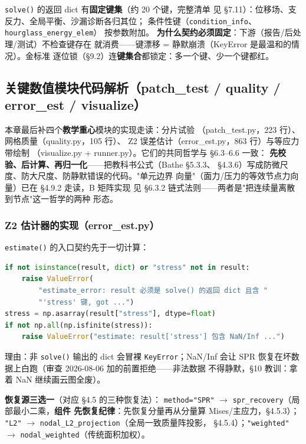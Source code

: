\documentclass[12pt,a4paper]{ctexart}
\newcommand{\fem}{\Verb}
\begin{document}
\fem|solve()| 的返回 dict 有\textbf{固定键集}（约 20 个键，完整清单
见 §7.11）：位移场、支反力、全局平衡、沙漏诊断各归其位；
条件性键（\fem|condition_info|、\fem|hourglass_energy_elem|）
按参数附加。
\textbf{为什么契约必须固定}：下游（报告/后处理/测试）不检查键存在
就消费——键漂移 = 静默崩溃（KeyError 是最温和的情况）。金标准
逐位锁（§9.2）连\textbf{键集合}都锁定：多一个键、少一个键都红。

\subsection{关键数值模块代码解析（patch\_test / quality / error\_est / visualize）}

本章最后补四个\textbf{教学重心}模块的实现走读：分片试验
（patch\_test.py，223 行）、网格质量（quality.py，105 行）、
Z2 误差估计（error\_est.py，863 行）与等应力带绘制
（visualize.py + runner.py）。它们的共同哲学与 §6.3--6.6 一致：
\textbf{先校验、后计算、再归一化}——把教科书公式（Bathe §5.3.3、
§4.3.6）写成防微尺度、防大尺度、防静默错误的代码。"单元边界
向量"（面力/压力的等效节点力向量）已在 §4.9.2 走读，B 矩阵实现
见 §6.3.2 链式法则——两者是"把连续量离散到节点"这一哲学的两种
形态。

\subsubsection{Z2 估计器的实现（error\_est.py）}

\fem|estimate()| 的入口契约先于一切计算：

\begin{lstlisting}[language=python]
if not isinstance(result, dict) or "stress" not in result:
    raise ValueError(
        "estimate_error: result 必须是 solve() 的返回 dict 且含 "
        "'stress' 键, got ...")
stress = np.asarray(result["stress"], dtype=float)
if not np.all(np.isfinite(stress)):
    raise ValueError("estimate: result['stress'] 包含 NaN/Inf ...")
\end{lstlisting}

理由：非 \fem|solve()| 输出的 dict 会冒裸 \fem|KeyError|；NaN/Inf 会让
SPR 恢复在坏数据上白跑（审查 2026-08-06 加的前置拒绝——非法数据
不得静默，§10 教训：拿着 NaN 继续画云图全废）。

\textbf{恢复源三选一}（对应 §4.5 的三种恢复法）：
\fem|method="SPR"| $\rightarrow$ \fem|spr_recovery|（局部最小二乘，\textbf{组件
先恢复纪律}：先恢复分量再从分量算 Mises/主应力，§4.5.3）；
\fem|"L2"| $\rightarrow$ \fem|nodal_L2_projection|（全局一致质量阵投影，
§4.5.4）；\fem|"weighted"| $\rightarrow$ \fem|nodal_weighted|（传统面积加权）。
\end{document}
